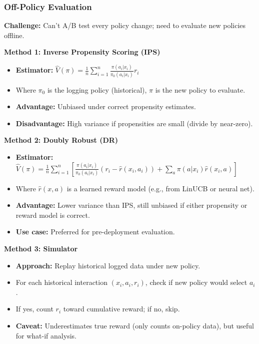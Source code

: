 \documentclass[11pt,letterpaper]{article}
\begin{document}
\subsubsection{Off-Policy Evaluation}

\textbf{Challenge:} Can't A/B test every policy change; need to evaluate new policies offline.

\textbf{Method 1: Inverse Propensity Scoring (IPS)}
\begin{itemize}
\item \textbf{Estimator:} $\hat{V}(\pi) = \frac{1}{n} \sum_{i=1}^{n} \frac{\pi(a_i | x_i)}{\pi_0(a_i | x_i)} r_i$
\item Where $\pi_0$ is the logging policy (historical), $\pi$ is the new policy to evaluate.
\item \textbf{Advantage:} Unbiased under correct propensity estimates.
\item \textbf{Disadvantage:} High variance if propensities are small (divide by near-zero).
\end{itemize}

\textbf{Method 2: Doubly Robust (DR)}
\begin{itemize}
\item \textbf{Estimator:} $\hat{V}(\pi) = \frac{1}{n} \sum_{i=1}^{n} \left[ \frac{\pi(a_i | x_i)}{\pi_0(a_i | x_i)} (r_i - \hat{r}(x_i, a_i)) + \sum_{a} \pi(a | x_i) \hat{r}(x_i, a) \right]$
\item Where $\hat{r}(x, a)$ is a learned reward model (e.g., from LinUCB or neural net).
\item \textbf{Advantage:} Lower variance than IPS, still unbiased if either propensity or reward model is correct.
\item \textbf{Use case:} Preferred for pre-deployment evaluation.
\end{itemize}

\textbf{Method 3: Simulator}
\begin{itemize}
\item \textbf{Approach:} Replay historical logged data under new policy.
\item For each historical interaction $(x_i, a_i, r_i)$, check if new policy would select $a_i$.
\item If yes, count $r_i$ toward cumulative reward; if no, skip.
\item \textbf{Caveat:} Underestimates true reward (only counts on-policy data), but useful for what-if analysis.
\end{itemize}
\end{document}
